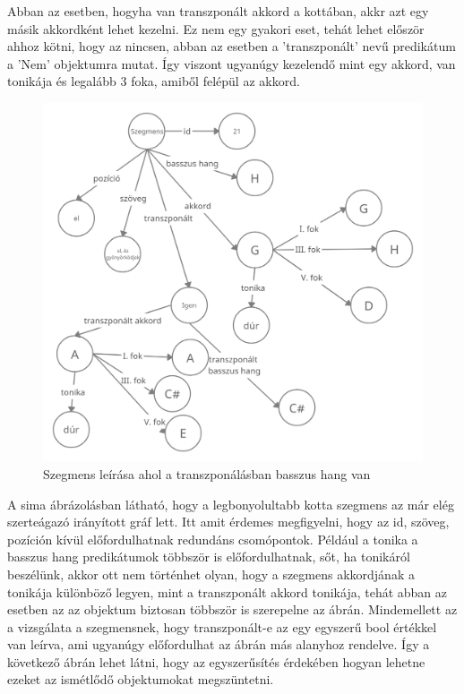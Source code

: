 Abban az esetben, hogyha van transzponált akkord a kottában, akkr azt egy másik akkordként lehet kezelni. Ez nem egy gyakori eset, tehát lehet először ahhoz kötni, hogy az nincsen, abban az esetben a 'transzponált' nevű predikátum a 'Nem' objektumra mutat. Így viszont ugyanúgy kezelendő mint egy akkord, van tonikája és legalább 3 foka, amiből felépül az akkord.
\newpage
\begin{figure}[h]
	\includegraphics[scale=0.29]{images/rdf_graph_6.png}
	\caption{Szegmens leírása ahol a transzponálásban basszus hang van}
	\label{fig:graph6}
\end{figure}

A sima ábrázolásban látható, hogy a legbonyolultabb kotta szegmens az már elég szerteágazó irányított gráf lett. Itt amit érdemes megfigyelni, hogy az id, szöveg, pozíción kívül előfordulhatnak redundáns csomópontok. Például a tonika a basszus hang predikátumok többször is előfordulhatnak, sőt, ha tonikáról beszélünk, akkor ott nem történhet olyan, hogy a szegmens akkordjának a tonikája különböző legyen, mint a transzponált akkord tonikája, tehát abban az esetben az az objektum biztosan többször is szerepelne az ábrán. Mindemellett az a vizsgálata a szegmensnek, hogy transzponált-e az egy egyszerű bool értékkel van leírva, ami ugyanúgy előfordulhat az ábrán más alanyhoz rendelve. Így a következő ábrán lehet látni, hogy az egyszerűsítés érdekében hogyan lehetne ezeket az ismétlődő objektumokat megszüntetni.

